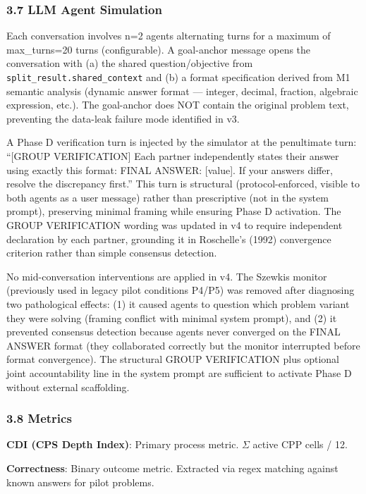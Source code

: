 \documentclass[
  11pt,
]{article}
\begin{document}
\subsubsection{3.7 LLM Agent Simulation}\label{llm-agent-simulation}

Each conversation involves n=2 agents alternating turns for a maximum of
max\_turns=20 turns (configurable). A goal-anchor message opens the
conversation with (a) the shared question/objective from
\texttt{split\_result.shared\_context} and (b) a format specification
derived from M1 semantic analysis (dynamic answer format --- integer,
decimal, fraction, algebraic expression, etc.). The goal-anchor does NOT
contain the original problem text, preventing the data-leak failure mode
identified in v3.

A Phase D verification turn is injected by the simulator at the
penultimate turn: ``{[}GROUP VERIFICATION{]} Each partner independently
states their answer using exactly this format: FINAL ANSWER:
{[}value{]}. If your answers differ, resolve the discrepancy first.''
This turn is structural (protocol-enforced, visible to both agents as a
user message) rather than prescriptive (not in the system prompt),
preserving minimal framing while ensuring Phase D activation. The GROUP
VERIFICATION wording was updated in v4 to require independent
declaration by each partner, grounding it in Roschelle's (1992)
convergence criterion rather than simple consensus detection.

No mid-conversation interventions are applied in v4. The Szewkis monitor
(previously used in legacy pilot conditions P4/P5) was removed after diagnosing two
pathological effects: (1) it caused agents to question which problem
variant they were solving (framing conflict with minimal system prompt),
and (2) it prevented consensus detection because agents never converged
on the FINAL ANSWER format (they collaborated correctly but the monitor
interrupted before format convergence). The structural GROUP
VERIFICATION plus optional joint accountability line in the system
prompt are sufficient to activate Phase D without external scaffolding.

\subsubsection{3.8 Metrics}\label{metrics}

\textbf{CDI (CPS Depth Index)}: Primary process metric. $\Sigma$ active CPP
cells / 12.

\textbf{Correctness}: Binary outcome metric. Extracted via regex
matching against known answers for pilot problems.
\end{document}
